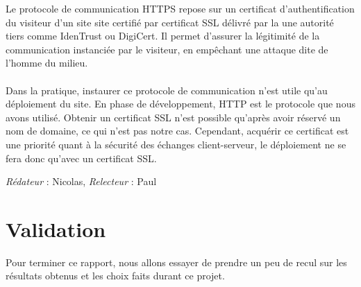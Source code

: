 \documentclass[oneside,a4paper,13pt]{article}
\begin{document}
Le protocole de communication HTTPS repose sur un certificat d'authentification du visiteur d'un site site certifié par certificat SSL délivré par la une autorité tiers comme IdenTrust ou DigiCert. Il permet d'assurer la légitimité de la communication instanciée par le visiteur, en empêchant une attaque dite de l'homme du milieu. \\ \\
Dans la pratique, instaurer ce protocole de communication n'est utile qu'au déploiement du site. En phase de développement, HTTP est le protocole que nous avons utilisé. Obtenir un certificat SSL n'est possible qu'après avoir réservé un nom de domaine, ce qui n'est pas notre cas. Cependant, acquérir ce certificat est une priorité quant à la sécurité des échanges client-serveur, le déploiement ne se fera donc qu'avec un certificat SSL.

\smallbreak\textit{Rédateur} : Nicolas, \textit{Relecteur} : Paul
\section{Validation}

Pour terminer ce rapport, nous allons essayer de prendre un peu de recul sur les résultats obtenus et les choix faits durant ce projet. 
\end{document}
